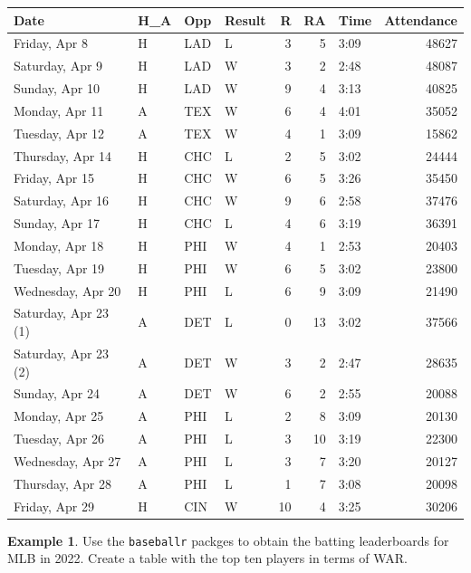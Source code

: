 \documentclass[
  11pt,
]{book}
\theoremstyle{definition}
\theoremstyle{definition}
\newtheorem{example}{Example}[chapter]
\theoremstyle{definition}
\theoremstyle{definition}
\theoremstyle{remark}
\begin{document}
\begin{tabular}{llllrrlr}
\toprule
Date & H\_A & Opp & Result & R & RA & Time & Attendance\\
\midrule
Friday, Apr 8 & H & LAD & L & 3 & 5 & 3:09 & 48627\\
Saturday, Apr 9 & H & LAD & W & 3 & 2 & 2:48 & 48087\\
Sunday, Apr 10 & H & LAD & W & 9 & 4 & 3:13 & 40825\\
Monday, Apr 11 & A & TEX & W & 6 & 4 & 4:01 & 35052\\
Tuesday, Apr 12 & A & TEX & W & 4 & 1 & 3:09 & 15862\\
\addlinespace
Thursday, Apr 14 & H & CHC & L & 2 & 5 & 3:02 & 24444\\
Friday, Apr 15 & H & CHC & W & 6 & 5 & 3:26 & 35450\\
Saturday, Apr 16 & H & CHC & W & 9 & 6 & 2:58 & 37476\\
Sunday, Apr 17 & H & CHC & L & 4 & 6 & 3:19 & 36391\\
Monday, Apr 18 & H & PHI & W & 4 & 1 & 2:53 & 20403\\
\addlinespace
Tuesday, Apr 19 & H & PHI & W & 6 & 5 & 3:02 & 23800\\
Wednesday, Apr 20 & H & PHI & L & 6 & 9 & 3:09 & 21490\\
Saturday, Apr 23 (1) & A & DET & L & 0 & 13 & 3:02 & 37566\\
Saturday, Apr 23 (2) & A & DET & W & 3 & 2 & 2:47 & 28635\\
Sunday, Apr 24 & A & DET & W & 6 & 2 & 2:55 & 20088\\
\addlinespace
Monday, Apr 25 & A & PHI & L & 2 & 8 & 3:09 & 20130\\
Tuesday, Apr 26 & A & PHI & L & 3 & 10 & 3:19 & 22300\\
Wednesday, Apr 27 & A & PHI & L & 3 & 7 & 3:20 & 20127\\
Thursday, Apr 28 & A & PHI & L & 1 & 7 & 3:08 & 20098\\
Friday, Apr 29 & H & CIN & W & 10 & 4 & 3:25 & 30206\\
\bottomrule
\end{tabular}

\newpage

\begin{example}
Use the \texttt{baseballr} packges to obtain the batting leaderboards for MLB in 2022. Create a table with the top ten players in terms of WAR.
\end{example}
\end{document}

